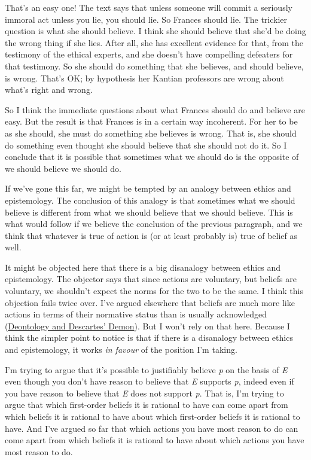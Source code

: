 \documentclass[
  11pt,
  letterpaper,
  DIV=11,
  numbers=noendperiod,
  twoside]{scrartcl}
\begin{document}
That's an easy one! The text says that unless someone will commit a
seriously immoral act unless you lie, you should lie. So Frances should
lie. The trickier question is what she should believe. I think she
should believe that she'd be doing the wrong thing if she lies. After
all, she has excellent evidence for that, from the testimony of the
ethical experts, and she doesn't have compelling defeaters for that
testimony. So she should do something that she believes, and should
believe, is wrong. That's OK; by hypothesis her Kantian professors are
wrong about what's right and wrong.

So I think the immediate questions about what Frances should do and
believe are easy. But the result is that Frances is in a certain way
incoherent. For her to be as she should, she must do something she
believes is wrong. That is, she should do something even thought she
should believe that she should not do it. So I conclude that it is
possible that sometimes what we should do is the opposite of we should
believe we should do.

If we've gone this far, we might be tempted by an analogy between ethics
and epistemology. The conclusion of this analogy is that sometimes what
we should believe is different from what we should believe that we
should believe. This is what would follow if we believe the conclusion
of the previous paragraph, and we think that whatever is true of action
is (or at least probably is) true of belief as well.

It might be objected here that there is a big disanalogy between ethics
and epistemology. The objector says that since actions are voluntary,
but beliefs are voluntary, we shouldn't expect the norms for the two to
be the same. I think this objection fails twice over. I've argued
elsewhere that beliefs are much more like actions in terms of their
normative status than is usually acknowledged
(\href{http://brian.weatherson.org/DDD.pdf}{Deontology and Descartes'
Demon}). But I won't rely on that here. Because I think the simpler
point to notice is that if there is a disanalogy between ethics and
epistemology, it works \emph{in favour} of the position I'm taking.

I'm trying to argue that it's possible to justifiably believe \emph{p}
on the basis of \emph{E} even though you don't have reason to believe
that \emph{E} supports \emph{p}, indeed even if you have reason to
believe that \emph{E} does not support \emph{p}. That is, I'm trying to
argue that which first-order beliefs it is rational to have can come
apart from which beliefs it is rational to have about which first-order
beliefs it is rational to have. And I've argued so far that which
actions you have most reason to do can come apart from which beliefs it
is rational to have about which actions you have most reason to do.
\end{document}
